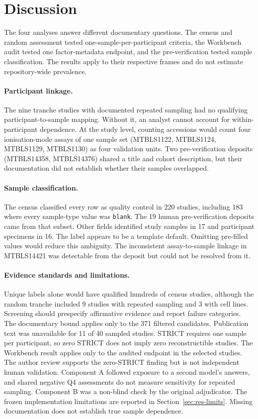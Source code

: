 \section{Discussion}\label{sec:discussion}

The four analyses answer different documentary questions. The census and random assessment tested one-sample-per-participant criteria, the Workbench audit tested one factor-metadata endpoint, and the pre-verification tested sample classification. The results apply to their respective frames and do not estimate repository-wide prevalence.

\paragraph{Participant linkage.} The nine tranche studies with documented repeated sampling had no qualifying participant-to-sample mapping. Without it, an analyst cannot account for within-participant dependence. At the study level, counting accessions would count four ionisation-mode assays of one sample set (MTBLS1122, MTBLS1124, MTBLS1129, MTBLS1130) as four validation units. Two pre-verification deposits (MTBLS14358, MTBLS14376) shared a title and cohort description, but their documentation did not establish whether their samples overlapped.

\paragraph{Sample classification.} The census classified every row as quality control in 220 studies, including 183 where every sample-type value was \texttt{blank}. The 19 human pre-verification deposits came from that subset. Other fields identified study samples in 17 and participant specimens in 16. The label appears to be a template default. Omitting pre-filled values would reduce this ambiguity. The inconsistent assay-to-sample linkage in MTBLS14421 was detectable from the deposit but could not be resolved from it.

\paragraph{Evidence standards and limitations.} Unique labels alone would have qualified hundreds of census studies, although the random tranche included 9 studies with repeated sampling and 3 with cell lines. Screening should prespecify affirmative evidence and report failure categories. The documentary bound applies only to the 371 filtered candidates. Publication text was unavailable for 11 of 40 sampled studies. STRICT requires one sample per participant, so zero STRICT does not imply zero reconstructible studies. The Workbench result applies only to the audited endpoint in the selected studies. The author review supports the zero-STRICT finding but is not independent human validation. Component A followed exposure to a second model's answers, and shared negative Q4 assessments do not measure sensitivity for repeated sampling. Component B was a non-blind check by the original adjudicator. The frozen implementation limitations are reported in Section~\ref{sec:res-limits}. Missing documentation does not establish true sample dependence.

